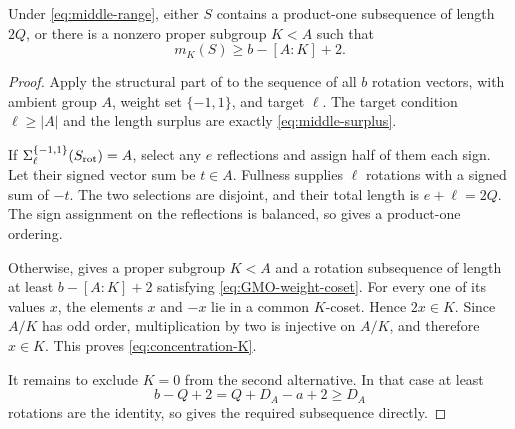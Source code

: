 \begin{proposition}
\label{prop:middle-reduction}
Under \eqref{eq:middle-range}, either \(S\) contains a product-one
subsequence of length \(2Q\), or there is a nonzero proper subgroup
\(K<A\) such that
\begin{equation}\label{eq:concentration-K}
  m_K(S)\ge b-[A:K]+2.
\end{equation}
\end{proposition}

\begin{proof}
Apply the structural part of  to the sequence of all
\(b\) rotation vectors, with ambient group \(A\), weight set
\(\{-1,1\}\), and target \(\ell\). The target condition
\(\ell\ge|A|\) and the length surplus are exactly
\eqref{eq:middle-surplus}.

If \(\Sigma_\ell^{\{-1,1\}}(S_{\rm rot})=A\), select any \(e\)
reflections and assign half of them each sign. Let their signed vector
sum be \(t\in A\). Fullness supplies \(\ell\) rotations with a signed
sum of \(-t\). The two selections are disjoint, and their total length
is \(e+\ell=2Q\). The sign assignment on the reflections is balanced,
so  gives a product-one ordering.

Otherwise,  gives a proper subgroup \(K<A\) and a
rotation subsequence of length at least \(b-[A:K]+2\) satisfying
\eqref{eq:GMO-weight-coset}. For every one of its values \(x\), the
elements \(x\) and \(-x\) lie in a common \(K\)-coset. Hence
\(2x\in K\). Since \(A/K\) has odd order, multiplication by two is
injective on \(A/K\), and therefore \(x\in K\). This proves
\eqref{eq:concentration-K}.

It remains to exclude \(K=0\) from the second alternative. In that
case at least
\[
  b-Q+2=Q+D_A-a+2\ge D_A
\]
rotations are the identity, so  gives the
required subsequence directly.
\end{proof}
